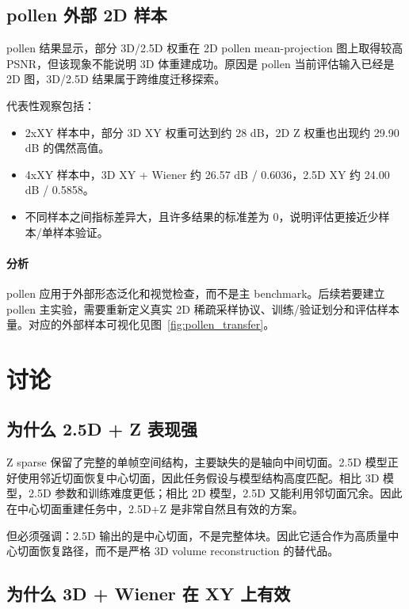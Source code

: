 \documentclass[UTF8, scheme=plain, 11pt, a4paper]{ctexart}
\begin{document}
\subsection{pollen 外部 2D 样本}

pollen 结果显示，部分 3D/2.5D 权重在 2D pollen mean-projection 图上取得较高 PSNR，但该现象不能说明 3D 体重建成功。原因是 pollen 当前评估输入已经是 2D 图，3D/2.5D 结果属于跨维度迁移探索。

代表性观察包括：
\begin{itemize}[leftmargin=*]
  \item 2xXY 样本中，部分 3D XY 权重可达到约 28 dB，2D Z 权重也出现约 29.90 dB 的偶然高值。
  \item 4xXY 样本中，3D XY + Wiener 约 26.57 dB / 0.6036，2.5D XY 约 24.00 dB / 0.5858。
  \item 不同样本之间指标差异大，且许多结果的标准差为 0，说明评估更接近少样本/单样本验证。
\end{itemize}

\paragraph{分析}
pollen 应用于外部形态泛化和视觉检查，而不是主 benchmark。后续若要建立 pollen 主实验，需要重新定义真实 2D 稀疏采样协议、训练/验证划分和评估样本量。对应的外部样本可视化见图~\ref{fig:pollen_transfer}。

\section{讨论}

\subsection{为什么 2.5D + Z 表现强}

Z sparse 保留了完整的单帧空间结构，主要缺失的是轴向中间切面。2.5D 模型正好使用邻近切面恢复中心切面，因此任务假设与模型结构高度匹配。相比 3D 模型，2.5D 参数和训练难度更低；相比 2D 模型，2.5D 又能利用邻切面冗余。因此在中心切面重建任务中，2.5D+Z 是非常自然且有效的方案。

但必须强调：2.5D 输出的是中心切面，不是完整体块。因此它适合作为高质量中心切面恢复路径，而不是严格 3D volume reconstruction 的替代品。

\subsection{为什么 3D + Wiener 在 XY 上有效}
\end{document}
